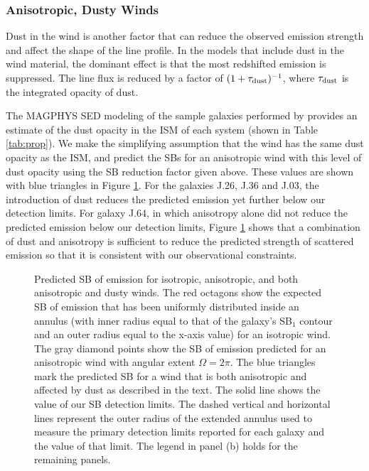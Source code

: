 \documentclass[trackchanges,twocolumn]{aastex62}
\begin{document}
\subsubsection{Anisotropic, Dusty Winds}

Dust in the wind is another factor that can reduce the observed emission strength and affect the shape of the  line profile. 
In the \cite{Prochaska_2011} models that include dust in the wind material, the dominant effect is that the most redshifted emission is suppressed. The line flux is reduced by a factor of $(1+\tau_{\rm{dust}})^{-1}$, where $\tau_{\rm{dust}}$ is the integrated opacity of dust. 

The MAGPHYS SED modeling of the sample galaxies performed by \cite{Rubin_2014} provides an
estimate of the dust opacity in the ISM of each system (shown in Table \ref{tab:prop}). %
We make the simplifying assumption
that the wind has the same dust opacity as the ISM, and predict the SBs for an anisotropic wind with this level of dust opacity using the SB reduction factor given above.  These values are shown with blue triangles in Figure \ref{fig.emission}.
For the galaxies J.26, J.36 and J.03, the introduction of dust reduces the predicted emission yet further below our detection limits. For galaxy J.64, in which anisotropy alone did not reduce the predicted emission below our detection limits, Figure \ref{fig.emission} shows that a combination of dust and anisotropy is sufficient to reduce the predicted strength of scattered emission %
so that it is consistent with our observational constraints.

\begin{figure}[h]
\centering
{}
\caption{Predicted SB of  emission for isotropic, anisotropic, and both anisotropic and dusty winds. The red octagons show the expected SB of emission that has been uniformly distributed inside an annulus (with inner radius equal to that of the galaxy's SB$_1$ contour and an outer radius equal to the x-axis value) for an isotropic wind. The gray diamond points show the SB of  emission predicted for an anisotropic wind with angular extent $\Omega=2\pi$. The blue triangles mark the predicted SB for a wind that is both anisotropic and affected by dust as described in the text. The solid line shows the value of our SB detection limits. The dashed vertical and horizontal lines represent the outer radius of the extended annulus used to measure the primary detection limits reported for each galaxy and the value of that limit. The legend in panel (b) holds for the remaining panels.}
\label{fig.emission}
\end{figure}
\end{document}
